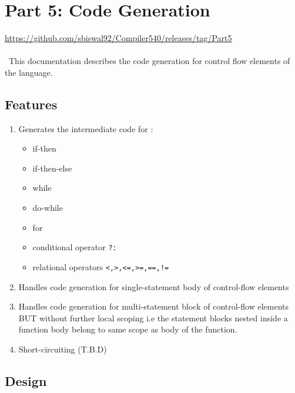 \documentclass[12pt]{article}
\begin{document}
\section{Part 5: Code Generation} 

\url{https://github.com/sbiswal92/Compiler540/releases/tag/Part5}
\\~
\\~This documentation describes the code generation for control flow elements of the language.

\subsection{Features}
\label{Features}
\begin{enumerate}
\item Generates the intermediate code for :
\begin {itemize}
\item if-then
\item if-then-else
\item while
\item do-while
\item for
\item conditional operator \texttt{?:}
\item relational operators \texttt{<,>,<=,>=,==,!=}
\end{itemize}
\item Handles code generation for single-statement body of control-flow elements
\item Handles code generation for multi-statement block of control-flow elements BUT without further local scoping i.e the statement blocks nested inside a function body belong to same scope as body of the function.
\item Short-circuiting (T.B.D)
\end{enumerate}


\subsection{Design}
\end{document}
